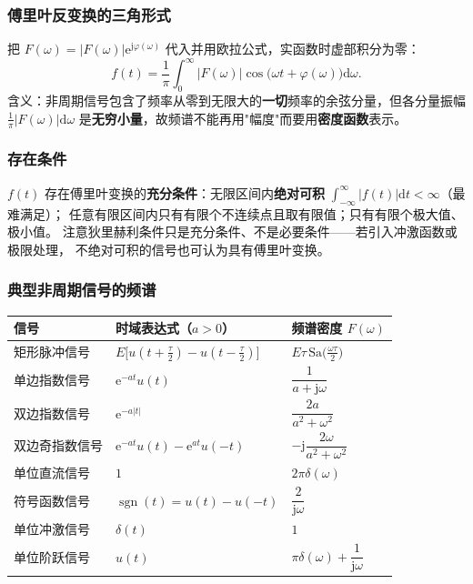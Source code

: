 \subsubsection{傅里叶反变换的三角形式}

把 $F(\omega)=|F(\omega)|\mathrm{e}^{\mathrm{j}\varphi(\omega)}$ 代入并用欧拉公式，实函数时虚部积分为零：
\begin{equation}
f(t)=\frac{1}{\pi}\int_{0}^{\infty}\big|F(\omega)\big|\cos\big(\omega t+\varphi(\omega)\big)\mathrm{d}\omega .
\end{equation}
含义：非周期信号包含了频率从零到无限大的\textbf{一切}频率的余弦分量，但各分量振幅
$\frac{1}{\pi}|F(\omega)|\mathrm{d}\omega$ 是\textbf{无穷小量}，故频谱不能再用"幅度"而要用\textbf{密度函数}表示。

\subsubsection{存在条件}

$f(t)$ 存在傅里叶变换的\textbf{充分条件}：无限区间内\textbf{绝对可积}
$\displaystyle\int_{-\infty}^{\infty}|f(t)|\mathrm{d}t<\infty$（最难满足）；
任意有限区间内只有有限个不连续点且取有限值；只有有限个极大值、极小值。
注意狄里赫利条件只是充分条件、不是必要条件——若引入冲激函数或极限处理，
不绝对可积的信号也可认为具有傅里叶变换。

\subsubsection{典型非周期信号的频谱}

\begin{center}
\begin{tabular}{lll}
\toprule
信号 & 时域表达式（$a>0$） & 频谱密度 $F(\omega)$ \\
\midrule
矩形脉冲信号 & $E\big[u(t+\frac{\tau}{2})-u(t-\frac{\tau}{2})\big]$ & $E\tau\,\mathrm{Sa}\big(\frac{\omega\tau}{2}\big)$ \\
单边指数信号 & $\mathrm{e}^{-at}u(t)$ & $\dfrac{1}{a+\mathrm{j}\omega}$ \\
双边指数信号 & $\mathrm{e}^{-a|t|}$ & $\dfrac{2a}{a^2+\omega^2}$ \\
双边奇指数信号 & $\mathrm{e}^{-at}u(t)-\mathrm{e}^{at}u(-t)$ & $-\mathrm{j}\dfrac{2\omega}{a^2+\omega^2}$ \\
单位直流信号 & $1$ & $2\pi\delta(\omega)$ \\
符号函数信号 & $\operatorname{sgn}(t)=u(t)-u(-t)$ & $\dfrac{2}{\mathrm{j}\omega}$ \\
单位冲激信号 & $\delta(t)$ & $1$ \\
单位阶跃信号 & $u(t)$ & $\pi\delta(\omega)+\dfrac{1}{\mathrm{j}\omega}$ \\
\bottomrule
\end{tabular}
\end{center}

